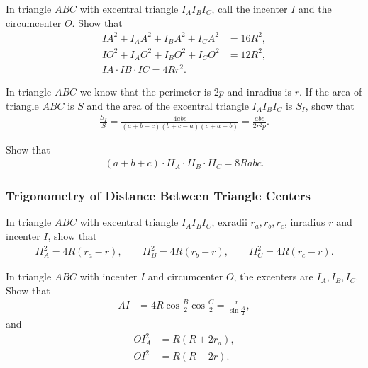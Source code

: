 \begin{question}
    In triangle $ABC$ with excentral triangle $I_AI_BI_C$, call the incenter $I$ and the circumcenter $O$. Show that
    \begin{align*}
        IA^2+I_AA^2+I_BA^2+I_CA^2 &= 16R^2,\\
        IO^2+I_AO^2+I_BO^2+I_CO^2 &= 12R^2,\\
        IA \cdot IB \cdot IC = 4Rr^2.
    \end{align*}
\end{question}

\begin{question}
    In triangle $ABC$ we know that the perimeter is $2p$ and inradius is $r$. If the area of triangle $ABC$ is $S$ and the area of the excentral triangle $I_AI_BI_C$ is $S_I$, show that
    \begin{align*}
        \frac{S_I}{S}= \frac{4abc}{(a+b-c)(b+c-a)(c+a-b)} = \frac{abc}{2r^2p}.
    \end{align*}
\end{question}

\begin{question}
    Show that 
    \begin{align*}
        (a+b+c)\cdot II_A \cdot II_B \cdot II_C = 8Rabc.
    \end{align*}
\end{question}

\subsubsection{Trigonometry of Distance Between Triangle Centers}

    \begin{question}[name=Distance Between Incenter and Excenters]
        In triangle $ABC$ with excentral triangle $I_AI_BI_C$, exradii $r_a,r_b,r_c$, inradius $r$ and incenter $I$, show that
        \begin{align*}
            II_A^2 = 4R(r_a-r), \qquad II_B^2 = 4R(r_b-r), \qquad II_C^2 = 4R(r_c-r).
        \end{align*}
    \end{question}



    \begin{question}[name=Distance Between Circumcenter and Incenter]
        In triangle $ABC$ with incenter $I$ and circumcenter $O$, the excenters are $I_A,I_B,I_C$. Show that
        \begin{align*}
            AI &=4R\cos\frac{B}{2}\cos\frac{C}{2}=\frac{r}{\displaystyle\sin\frac{A}{2}},
        \end{align*}
        and
        \begin{align*}
            OI_A^2 &= R(R+2r_a),\\
            OI^2 &= R(R-2r).            
        \end{align*}
    \end{question}




